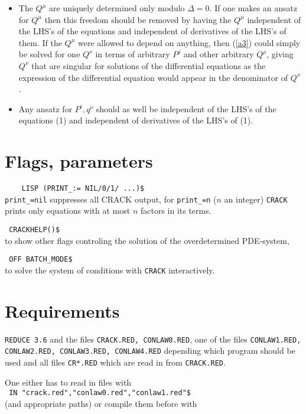 \documentclass[12pt]{article}
\begin{document}
\begin{itemize}
\item The $Q^{\mu}$ are uniquely determined only modulo $\Delta=0$.
If one makes an ansatz for $Q^{\mu}$ then this freedom should be removed
by having
the $Q^{\mu}$ independent of the LHS's of the equations and independent of
derivatives of the LHS's of them. If the $Q^{\mu}$ were allowed to depend on
anything, then (\ref{a3}) could simply be solved for one $Q^{\nu}$ in terms of
arbitrary $P^j$ and other arbitrary $Q^{\rho}$, giving $Q^{\nu}$ that are
singular for solutions of the differential equations as the expression
of the differential equation would appear in the denominator of $Q^{\nu}$.

\item Any ansatz for $P^i,q^{\nu}$ should
as well be independent of the LHS's of the equations (1) and independent of
derivatives of the LHS's of (1).

\end{itemize}

\section{Flags, parameters}

\verb+    LISP (PRINT_:= NIL/0/1/ ...)$+ \\
\verb+print_=nil+ suppresses all CRACK output, for \verb+print_=n+ 
($n$ an integer) 
{\tt CRACK} prints only equations with at most $n$ factors in its terms.


\verb+ CRACKHELP()$+ \\
to show other flags controling the solution of the overdetermined PDE-system,

\verb+ OFF BATCH_MODE$+ \\
to solve the system of conditions with {\tt CRACK} interactively.

\section{Requirements}

{\tt REDUCE 3.6} and 
the files {\tt CRACK.RED, CONLAW0.RED}, one of the files
{\tt CONLAW1.RED, CONLAW2.RED, CONLAW3.RED, CONLAW4.RED} depending which
program should be used and all files {\tt CR*.RED} which 
are read in from {\tt CRACK.RED}.

One either has to read in files with \\
\verb+ IN "crack.red","conlaw0.red","conlaw1.red"$+ \\
\noindent (and appropriate paths) or compile them before with
\end{document}
